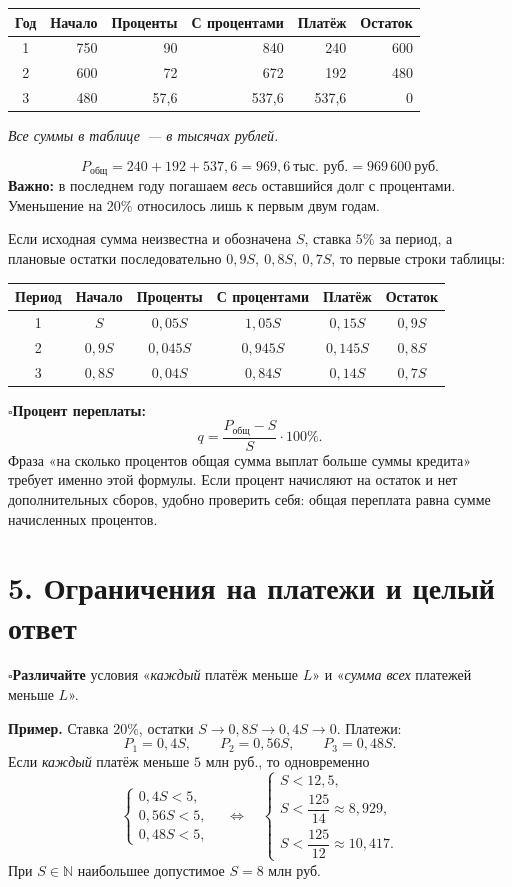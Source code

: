 \documentclass[a4paper,12pt]{article}
\newcommand{\mcheck}{\textcolor{accent}{\(\square\)}\hspace{3pt}}
\newcommand{\minorhead}[1]{\vspace{4pt}{\large\bfseries\color{darkaccent}#1}\par\vspace{0pt}}
\newcommand{\lessonhead}[1]{\section*{\color{darkaccent}#1}}
\begin{document}
\begin{center}
\small
\begin{tabular}{@{}c r r r r r@{}}
\toprule
Год & Начало & Проценты & С процентами & Платёж & Остаток\\
\midrule
1 & 750 & 90 & 840 & 240 & 600\\
2 & 600 & 72 & 672 & 192 & 480\\
3 & 480 & 57,6 & 537,6 & 537,6 & 0\\
\bottomrule
\end{tabular}
\end{center}
\vspace{-2pt}
\textit{Все суммы в таблице~--- в тысячах рублей.}

\[
\boxed{P_{\text{общ}}=240+192+537{,}6=969{,}6\ \text{тыс. руб.}=969\,600\ \text{руб.}}
\]
\textbf{Важно:} в последнем году погашаем \emph{весь} оставшийся долг с процентами. Уменьшение на \(20\%\) относилось лишь к первым двум годам.

\minorhead{Остатки можно задавать буквами}
Если исходная сумма неизвестна и обозначена \(S\), ставка \(5\%\) за период, а плановые остатки последовательно \(0{,}9S,\ 0{,}8S,\ 0{,}7S\), то первые строки таблицы:
\begin{center}
\small
\begin{tabular}{@{}c c c c c c@{}}
\toprule
Период & Начало & Проценты & С процентами & Платёж & Остаток\\
\midrule
1 & \(S\) & \(0{,}05S\) & \(1{,}05S\) & \(0{,}15S\) & \(0{,}9S\)\\
2 & \(0{,}9S\) & \(0{,}045S\) & \(0{,}945S\) & \(0{,}145S\) & \(0{,}8S\)\\
3 & \(0{,}8S\) & \(0{,}04S\) & \(0{,}84S\) & \(0{,}14S\) & \(0{,}7S\)\\
\bottomrule
\end{tabular}
\end{center}
\mcheck\textbf{Процент переплаты:}
\[
\boxed{q=\frac{P_{\text{общ}}-S}{S}\cdot100\%}.
\]
Фраза «на сколько процентов общая сумма выплат больше суммы кредита» требует именно этой формулы. Если процент начисляют на остаток и нет дополнительных сборов, удобно проверить себя: общая переплата равна сумме начисленных процентов.

\lessonhead{5. Ограничения на платежи и целый ответ}
\mcheck\textbf{Различайте} условия «\emph{каждый} платёж меньше \(L\)» и «\emph{сумма всех} платежей меньше \(L\)».

\textbf{Пример.} Ставка \(20\%\), остатки \(S\to0{,}8S\to0{,}4S\to0\). Платежи:
\[
P_1=0{,}4S,\qquad P_2=0{,}56S,\qquad P_3=0{,}48S.
\]
Если \emph{каждый} платёж меньше \(5\) млн руб., то одновременно
\[
\begin{cases}
0{,}4S<5,\\
0{,}56S<5,\\
0{,}48S<5,
\end{cases}
\quad\Longleftrightarrow\quad
\begin{cases}
S<12{,}5,\\
S<\dfrac{125}{14}\approx8{,}929,\\
S<\dfrac{125}{12}\approx10{,}417.
\end{cases}
\]
При \(S\in\mathbb N\) наибольшее допустимое \(S=8\) млн руб.
\end{document}
